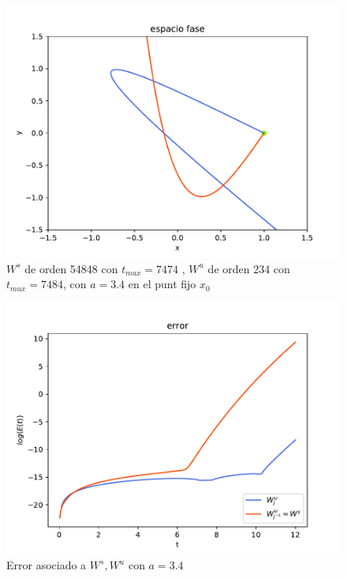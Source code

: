 \begin{figure}[H]
\centering
\includegraphics[scale=0.6]{jung34}
\caption{$W^{s}$ de orden 54848 con $t_{max}=7474$ , $W^{u}$ de orden 234 con $t_{max}=7484$, con $a=3.4$ en el punt fijo $x_{0}$}
\label{jung1}
\end{figure}


\begin{figure}[H]
\centering
\includegraphics[scale=0.6]{error_jung34}
\caption{Error asociado a $W^{s},W^{u}$ con $a=3.4$}
\label{errorjung1}
\end{figure}




